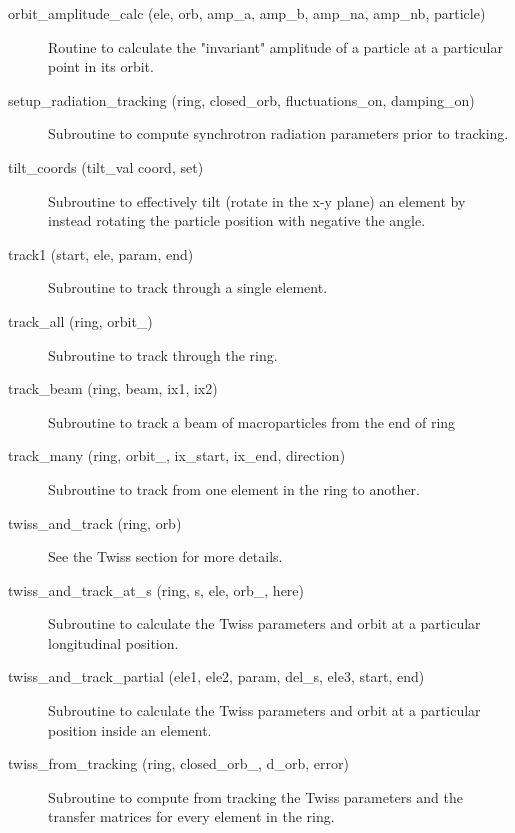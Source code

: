 \begin{description}
\item[orbit\_amplitude\_calc (ele, orb, amp\_a, amp\_b, amp\_na, amp\_nb, particle)] \Newline
Routine to calculate the "invariant" amplitude of a particle at a 
particular point in its orbit. 

\item[setup\_radiation\_tracking (ring, closed\_orb, fluctuations\_on, damping\_on)] \Newline
Subroutine to compute synchrotron radiation parameters prior to tracking. 

\item[tilt\_coords (tilt\_val coord, set)] \Newline
Subroutine to effectively tilt (rotate in the x-y plane) an element by 
instead rotating the particle position with negative the angle. 

\item[track1 (start, ele, param, end)] \Newline
Subroutine to track through a single element. 

\item[track\_all (ring, orbit\_)] \Newline
Subroutine to track through the ring. 

\item[track\_beam (ring, beam, ix1, ix2)] \Newline 
     Subroutine to track a beam of macroparticles from the end of
     ring%

\item[track\_many (ring, orbit\_, ix\_start, ix\_end, direction)] \Newline
Subroutine to track from one element in the ring to another. 

\item[twiss\_and\_track (ring, orb)] \Newline
See the Twiss section for more details. 

\item[twiss\_and\_track\_at\_s (ring, s, ele, orb\_, here)] \Newline
Subroutine to calculate the Twiss parameters and orbit at a particular longitudinal position. 

\item[twiss\_and\_track\_partial (ele1, ele2, param, del\_s, ele3, start, end)] \Newline
Subroutine to calculate the Twiss parameters and orbit at a particular position inside an element. 

\item[twiss\_from\_tracking (ring, closed\_orb\_, d\_orb, error)] \Newline
Subroutine to compute from tracking the Twiss parameters and the transfer matrices 
for every element in the ring. 

\end{description}

